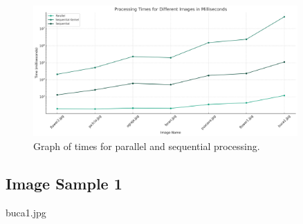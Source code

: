 \documentclass[10pt]{article}
\begin{document}
\begin{figure}[h]
\centering
\includegraphics[width=0.9\textwidth]{images/final_time_plot.jpg}
\caption{Graph of times for parallel and sequential processing.}
\label{fig:mbk}
\end{figure}

\pagebreak

\subsection{Image Sample 1}
buca1.jpg
\end{document}
